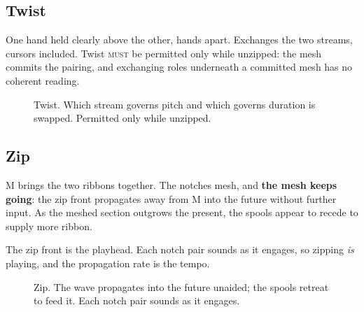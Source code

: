 \documentclass[11pt,a4paper]{article}
\newcommand{\MUST}{\textsc{must}}
\theoremstyle{definition}
\theoremstyle{plain}
\theoremstyle{remark}
\newcommand{\spools}{%
  \fill[ribL,opacity=.45,rounded corners=2pt] (1.55,5.40) rectangle (2.45,5.95);
  \fill[ribR,opacity=.45,rounded corners=2pt] (5.55,5.40) rectangle (6.45,5.95);
  \node[font=\scriptsize] at (2,6.22) {left spool};
  \node[font=\scriptsize] at (6,6.22) {right spool};
}
\newcommand{\musician}{%
  \draw[gray] (4,-0.10) circle (0.23);
  \node[font=\scriptsize] at (4,-0.10) {M};
}
\newcommand{\axes}{%
  \draw[->,gray,thin] (0.85,4.30) -- (1.45,4.30) node[right,font=\scriptsize]{$x$};
  \draw[->,gray,thin] (0.85,4.30) -- (0.85,4.90) node[above,font=\scriptsize]{$z$};
}
\newcommand{\ribbonsopen}{%
  \draw[ribL,opacity=.45,line width=16pt,line join=round]
    (2,5.40) -- (2,4.60) -- (3.10,4.00) -- (3.10,0.70);
  \draw[ribR,opacity=.45,line width=16pt,line join=round]
    (6,5.40) -- (6,4.60) -- (4.90,4.00) -- (4.90,0.70);
}
\newcommand{\ribbonszipped}{%
  \draw[ribL,opacity=.45,line width=16pt,line join=round]
    (2,5.40) -- (2,4.60) -- (3.72,4.20) -- (3.72,2.20) -- (3.10,1.70) -- (3.10,0.70);
  \draw[ribR,opacity=.45,line width=16pt,line join=round]
    (6,5.40) -- (6,4.60) -- (4.28,4.20) -- (4.28,2.20) -- (4.90,1.70) -- (4.90,0.70);
}
\newcommand{\mesh}[2]{%
  \draw[gray!75,decorate,decoration={zigzag,segment length=5pt,amplitude=3pt}]
    (4,#1) -- (4,#2);
}
\newcommand{\handat}[2]{\filldraw[fill=white,draw=gray!80,thin] (#1,#2) circle (0.17);}
\newcommand{\handsdefault}{\handat{3.10}{0.55}\handat{4.90}{0.55}}
\begin{document}
\subsection{Twist}

One hand held clearly above the other, hands apart. Exchanges the two streams, cursors included.
Twist \MUST{} be permitted only while unzipped: the mesh commits the pairing, and exchanging roles
underneath a committed mesh has no coherent reading.

\begin{figure}[H]\centering
{}
\caption{Twist. Which stream governs pitch and which governs duration is swapped. Permitted only
while unzipped.}
\end{figure}

\subsection{Zip}

M brings the two ribbons together. The notches mesh, and \textbf{the mesh keeps going}: the zip
front propagates away from M into the future without further input. As the meshed section outgrows
the present, the spools appear to recede to supply more ribbon.

The zip front is the playhead. Each notch pair sounds as it engages, so zipping \emph{is} playing,
and the propagation rate is the tempo.

\begin{figure}[H]\centering
{}
\caption{Zip. The wave propagates into the future unaided; the spools retreat to feed it. Each
notch pair sounds as it engages.}
\end{figure}
\end{document}
